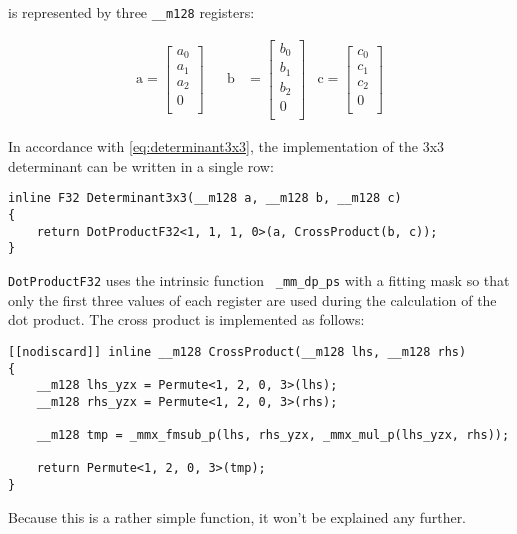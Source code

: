 is represented by three \texttt{__m128} registers:

\begin{align*}
\mathrm{a} 
=
\begin{bmatrix}
a_0\\
a_1\\
a_2\\
0\\
\end{bmatrix}
&&
\mathrm{b} 
&=
\begin{bmatrix}
b_0\\
b_1\\
b_2\\
0\\
\end{bmatrix}
&
\mathrm{c} 
=
\begin{bmatrix}
c_0\\
c_1\\
c_2\\
0\\
\end{bmatrix}
\end{align*}

In accordance with \cref{eq:determinant3x3}, the implementation of the 3x3 determinant can be written in a single row:

\begin{verbatim}
inline F32 Determinant3x3(__m128 a, __m128 b, __m128 c)
{
    return DotProductF32<1, 1, 1, 0>(a, CrossProduct(b, c));
}
\end{verbatim}

\texttt{DotProductF32} uses the intrinsic function \texttt{ _mm_dp_ps} with a fitting mask so that only the first three values of each register are used during the calculation of the dot product. 
The cross product is implemented as follows:

\begin{verbatim}
[[nodiscard]] inline __m128 CrossProduct(__m128 lhs, __m128 rhs)
{
    __m128 lhs_yzx = Permute<1, 2, 0, 3>(lhs);
    __m128 rhs_yzx = Permute<1, 2, 0, 3>(rhs);

    __m128 tmp = _mmx_fmsub_p(lhs, rhs_yzx, _mmx_mul_p(lhs_yzx, rhs));

    return Permute<1, 2, 0, 3>(tmp);
}
\end{verbatim}

Because this is a rather simple function, it won't be explained any further.



\newpage
